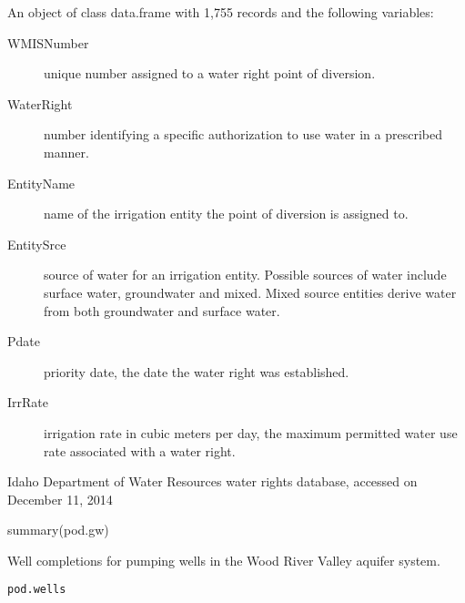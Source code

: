 \documentclass[a4paper]{book}
\begin{document}
\begin{Format}
An object of class data.frame with 1,755 records and the following variables:
\begin{description}

\item[WMISNumber] unique number assigned to a water right point of diversion.
\item[WaterRight] number identifying a specific authorization to use
water in a prescribed manner.
\item[EntityName] name of the irrigation entity the point of diversion is assigned to.
\item[EntitySrce] source of water for an irrigation entity.
Possible sources of water include surface water, groundwater and mixed.
Mixed source entities derive water from both groundwater and surface water.
\item[Pdate] priority date, the date the water right was established.
\item[IrrRate] irrigation rate in cubic meters per day,
the maximum permitted water use rate associated with a water right.

\end{description}

\end{Format}
%
\begin{Source}\relax
Idaho Department of Water Resources water rights database,
accessed on December 11, 2014
\end{Source}
%
\begin{SeeAlso}\relax
{}
\end{SeeAlso}
%
\begin{Examples}
\begin{ExampleCode}
summary(pod.gw)

\end{ExampleCode}
\end{Examples}
%
\begin{Description}\relax
Well completions for pumping wells in the Wood River Valley aquifer system.
\end{Description}
%
\begin{Usage}
\begin{verbatim}
pod.wells
\end{verbatim}
\end{Usage}
%
\end{document}
